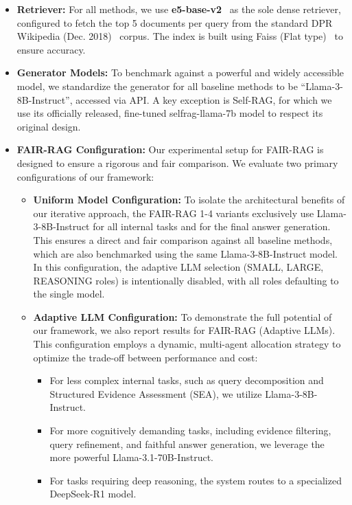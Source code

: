 \documentclass[11pt]{article}
\begin{document}
\begin{itemize}
    \item \textbf{Retriever:} For all methods, we use \textbf{e5-base-v2}~\cite{wang2024textembeddingsweaklysupervisedcontrastive} as the sole dense retriever, configured to fetch the top 5 documents per query from the standard DPR Wikipedia (Dec. 2018)~\cite{karpukhin2020dense} corpus. The index is built using Faiss (Flat type)~\cite{johnson2019billion} to ensure accuracy.
    
    \item \textbf{Generator Models:} To benchmark against a powerful and widely accessible model, we standardize the generator for all baseline methods to be ``Llama-3-8B-Instruct'', accessed via API. A key exception is Self-RAG, for which we use its officially released, fine-tuned selfrag-llama-7b model to respect its original design.
    
    \item \textbf{FAIR-RAG Configuration:} Our experimental setup for FAIR-RAG is designed to ensure a rigorous and fair comparison. We evaluate two primary configurations of our framework:
    \begin{itemize}
        \item \textbf{Uniform Model Configuration:} To isolate the architectural benefits of our iterative approach, the FAIR-RAG 1-4 variants exclusively use Llama-3-8B-Instruct for all internal tasks and for the final answer generation. This ensures a direct and fair comparison against all baseline methods, which are also benchmarked using the same Llama-3-8B-Instruct model. In this configuration, the adaptive LLM selection (SMALL, LARGE, REASONING roles) is intentionally disabled, with all roles defaulting to the single model.
        
        \item \textbf{Adaptive LLM Configuration:} To demonstrate the full potential of our framework, we also report results for FAIR-RAG (Adaptive LLMs). This configuration employs a dynamic, multi-agent allocation strategy to optimize the trade-off between performance and cost:
        \begin{itemize}
            \item For less complex internal tasks, such as query decomposition and Structured Evidence Assessment (SEA), we utilize Llama-3-8B-Instruct.
            \item For more cognitively demanding tasks, including evidence filtering, query refinement, and faithful answer generation, we leverage the more powerful Llama-3.1-70B-Instruct.~\cite{meta2024llama3}
            \item For tasks requiring deep reasoning, the system routes to a specialized DeepSeek-R1 model.~\cite{deepseek2025r1}
        \end{itemize}
    \end{itemize}
\end{itemize}
\end{document}
